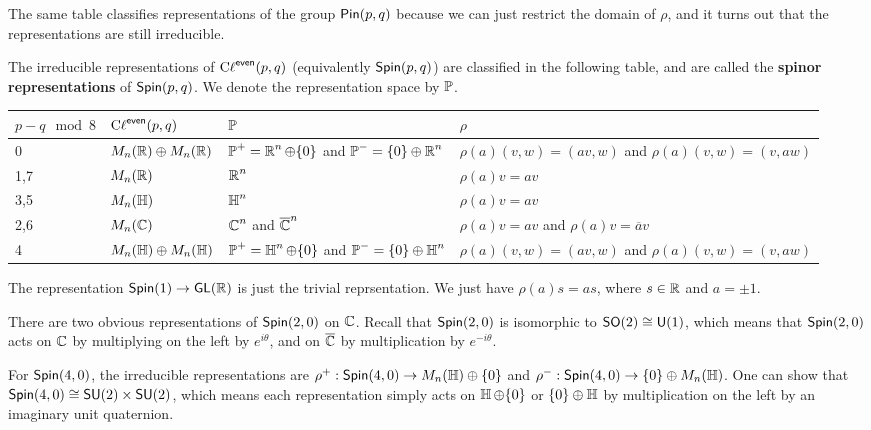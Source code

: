 \begin{remark*}
    The same table classifies representations of the group $\operatorname{\textsf{Pin}}(p,q)$ because we can just restrict the domain of $\rho$, and it turns out that the representations are still irreducible.
\end{remark*}

\begin{thm}
    The irreducible representations of $\operatorname{C\ell}^{\textsf{even}}(p,q)$ (equivalently $\operatorname{\textsf{Spin}}(p,q)$) are classified in the following table, and are called the \textbf{spinor representations} of $\operatorname{\textsf{Spin}}(p,q)$. We denote the representation space by $\operatorname{\mathbb{P}}$.
    \begin{center}
        \begin{tabular}{llll}
$p-q\mod 8$ & $\operatorname{C\ell}^{\textsf{even}}(p,q)$ & $\operatorname{\mathbb{P}}$                                                      & $\rho$                                              \\ \hline
0           & $M_n(\operatorname{\mathbb{R}})\oplus M_n(\operatorname{\mathbb{R}})$  & $\operatorname{\mathbb{P}}^+ = \operatorname{\mathbb{R}}^n\oplus \{0\}$ and $\operatorname{\mathbb{P}}^- = \{0\}\oplus\operatorname{\mathbb{R}}^n$ & $\rho(a)(v,w) = (av,w)$ and $\rho(a)(v,w) = (v,aw)$ \\
1,7         & $M_n(\operatorname{\mathbb{R}})$                 & $\operatorname{\mathbb{R}}^n$                                                    & $\rho(a)v=av$                                       \\
3,5         & $M_n(\operatorname{\mathbb{H}})$                 & $\operatorname{\mathbb{H}}^n$                                                    & $\rho(a)v=av$                                       \\
2,6         & $M_n(\operatorname{\mathbb{C}})$                 & $\operatorname{\mathbb{C}}^n$ and $\overline{\operatorname{\mathbb{C}}}^n$                             & $\rho(a)v=av$ and $\rho(a)v=\overline{a}v$          \\
4           & $M_n(\operatorname{\mathbb{H}})\oplus M_n(\operatorname{\mathbb{H}})$  & $\operatorname{\mathbb{P}}^+ = \operatorname{\mathbb{H}}^n\oplus \{0\}$ and $\operatorname{\mathbb{P}}^- = \{0\}\oplus\operatorname{\mathbb{H}}^n$ & $\rho(a)(v,w) = (av,w)$ and $\rho(a)(v,w) = (v,aw)$
\end{tabular}
    \end{center}
\end{thm}
\begin{example}
    The representation $\operatorname{\textsf{Spin}}(1)\to \operatorname{\textsf{GL}}(\operatorname{\mathbb{R}})$ is just the trivial reprsentation. We just have $\rho(a)s = as$, where $s\in\operatorname{\mathbb{R}}$ and $a=\pm 1$.

    There are two obvious representations of $\operatorname{\textsf{Spin}}(2,0)$ on $\operatorname{\mathbb{C}}$. Recall that $\operatorname{\textsf{Spin}}(2,0)$ is isomorphic to $\operatorname{\textsf{SO}}(2)\cong \operatorname{\textsf{U}}(1)$, which means that $\operatorname{\textsf{Spin}}(2,0)$ acts on $\operatorname{\mathbb{C}}$ by multiplying on the left by $e^{i\theta}$, and on $\overline{\operatorname{\mathbb{C}}}$ by multiplication by $e^{-i\theta}$.

    For $\operatorname{\textsf{Spin}}(4,0)$, the irreducible representations are $\rho^+ : \operatorname{\textsf{Spin}}(4,0) \to M_n(\operatorname{\mathbb{H}})\oplus \{0\}$ and $\rho^- : \operatorname{\textsf{Spin}}(4,0) \to \{0\}\oplus M_n(\operatorname{\mathbb{H}})$. One can show that $\operatorname{\textsf{Spin}}(4,0) \cong \operatorname{\textsf{SU}}(2)\times \operatorname{\textsf{SU}}(2)$, which means each representation simply acts on $\operatorname{\mathbb{H}}\oplus \{0\}$ or $\{0\}\oplus\operatorname{\mathbb{H}}$ by multiplication on the left by an imaginary unit quaternion.
\end{example}


